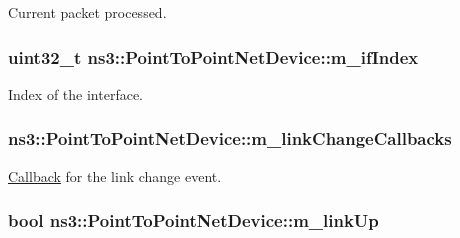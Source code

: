 Current packet processed. 

\subsubsection[{\texorpdfstring{m\+\_\+if\+Index}{m_ifIndex}}]{\setlength{\rightskip}{0pt plus 5cm}uint32\+\_\+t ns3\+::\+Point\+To\+Point\+Net\+Device\+::m\+\_\+if\+Index\hspace{0.3cm}{\ttfamily [private]}}\hypertarget{classns3_1_1PointToPointNetDevice_afc76a589eff37b6c4d72a857fe043f4c}{}\label{classns3_1_1PointToPointNetDevice_afc76a589eff37b6c4d72a857fe043f4c}


Index of the interface. 

\subsubsection[{\texorpdfstring{m\+\_\+link\+Change\+Callbacks}{m_linkChangeCallbacks}}]{ ns3\+::\+Point\+To\+Point\+Net\+Device\+::m\+\_\+link\+Change\+Callbacks\hspace{0.3cm}{\ttfamily [private]}}\hypertarget{classns3_1_1PointToPointNetDevice_a1da9efae73bde76f5a09dff8e4752e0b}{}\label{classns3_1_1PointToPointNetDevice_a1da9efae73bde76f5a09dff8e4752e0b}


\hyperlink{classns3_1_1Callback}{Callback} for the link change event. 

\subsubsection[{\texorpdfstring{m\+\_\+link\+Up}{m_linkUp}}]{\setlength{\rightskip}{0pt plus 5cm}bool ns3\+::\+Point\+To\+Point\+Net\+Device\+::m\+\_\+link\+Up\hspace{0.3cm}{\ttfamily [private]}}\hypertarget{classns3_1_1PointToPointNetDevice_a879bb70a26867e21d063301af8f2f22a}{}\label{classns3_1_1PointToPointNetDevice_a879bb70a26867e21d063301af8f2f22a}


